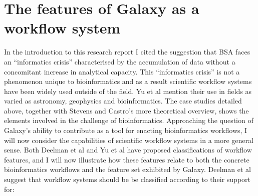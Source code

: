 \documentclass[a4paper,10pt]{scrreprt} \usepackage[utf8]{inputenc}
\begin{document}
%
%
%
%
%
%
%

\section{The features of Galaxy as a workflow system}

In the introduction to this research report I cited the suggestion that \gls{BSA} faces an ``informatics crisis'' characterised by the accumulation of data without a concomitant increase in analytical capacity. This ``informatics crisis'' is not a phenomenon unique to bioinformatics and as a result scientific workflow systems have been widely used outside of the field. Yu et al mention their use in fields as varied as astronomy, geophysics and bioinformatics. \cite{yu_taxonomy_2005} The case studies detailed above, together with Stevens and Castro's more theoretical overview, shows the elements involved in the challenge of bioinformatics. Approaching the question of Galaxy's ability to contribute as a tool for enacting bioinformatics workflows, I will now consider the capabilities of scientific workflow systems in a more general sense. Both Deelman et al \cite{deelman_workflows_2009} and Yu et al \cite{yu_taxonomy_2005} have proposed classifications of workflow features, and I will now illustrate how these 
features relate to both the concrete bioinformatics workflows and the feature set exhibited by Galaxy. Deelman et al suggest that workflow systems should be be classified according to their support for:
\end{document}
